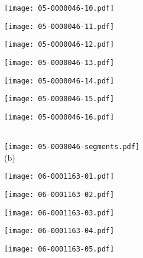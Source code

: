 \documentclass[10pt,twocolumn,letterpaper]{article}
\begin{document}
\begin{figure*}[t]
 \begin{minipage}{0.058\textwidth} \centering \texttt{[image: 05-0000046-10.pdf]} \end{minipage}
 \begin{minipage}{0.058\textwidth} \centering \texttt{[image: 05-0000046-11.pdf]} \end{minipage}
 \begin{minipage}{0.058\textwidth} \centering \texttt{[image: 05-0000046-12.pdf]} \end{minipage}
 \begin{minipage}{0.058\textwidth} \centering \texttt{[image: 05-0000046-13.pdf]} \end{minipage}
 \begin{minipage}{0.058\textwidth} \centering \texttt{[image: 05-0000046-14.pdf]} \end{minipage}
 \begin{minipage}{0.058\textwidth} \centering \texttt{[image: 05-0000046-15.pdf]} \end{minipage}
 \begin{minipage}{0.058\textwidth} \centering \texttt{[image: 05-0000046-16.pdf]} \end{minipage}
 \\ \vspace{2mm}
 \texttt{[image: 05-0000046-segments.pdf]}
 \\
 (b)
 \\ \vspace{2mm}
 \begin{minipage}{0.058\textwidth} \centering \texttt{[image: 06-0001163-01.pdf]} \end{minipage}
 \begin{minipage}{0.058\textwidth} \centering \texttt{[image: 06-0001163-02.pdf]} \end{minipage}
 \begin{minipage}{0.058\textwidth} \centering \texttt{[image: 06-0001163-03.pdf]} \end{minipage}
 \begin{minipage}{0.058\textwidth} \centering \texttt{[image: 06-0001163-04.pdf]} \end{minipage}
 \begin{minipage}{0.058\textwidth} \centering \texttt{[image: 06-0001163-05.pdf]} \end{minipage}

\end{figure*}
\end{document}
